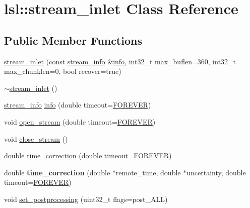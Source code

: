 \hypertarget{classlsl_1_1stream__inlet}{}\section{lsl\+:\+:stream\+\_\+inlet Class Reference}
\label{classlsl_1_1stream__inlet}
\subsection*{Public Member Functions}
\begin{DoxyCompactItemize}
\item 
\hyperlink{classlsl_1_1stream__inlet_a7c93b7d4fc053b2e3320841371b32919}{stream\+\_\+inlet} (const \hyperlink{classlsl_1_1stream__info}{stream\+\_\+info} \&\hyperlink{classlsl_1_1stream__inlet_ae895a8d5c10dc4072e969686fc402b5b}{info}, int32\+\_\+t max\+\_\+buflen=360, int32\+\_\+t max\+\_\+chunklen=0, bool recover=true)
\item 
\hyperlink{classlsl_1_1stream__inlet_ac3b37a1c2e376280c3144f422bb27d79}{$\sim$stream\+\_\+inlet} ()
\item 
\hyperlink{classlsl_1_1stream__info}{stream\+\_\+info} \hyperlink{classlsl_1_1stream__inlet_ae895a8d5c10dc4072e969686fc402b5b}{info} (double timeout=\hyperlink{namespacelsl_a74cfbc9077aca21295117217249721ed}{F\+O\+R\+E\+V\+ER})
\item 
void \hyperlink{classlsl_1_1stream__inlet_ad84029ed0662d755b0544c7652348718}{open\+\_\+stream} (double timeout=\hyperlink{namespacelsl_a74cfbc9077aca21295117217249721ed}{F\+O\+R\+E\+V\+ER})
\item 
void \hyperlink{classlsl_1_1stream__inlet_a77c2f10ed843723c7473aa52dcf544a0}{close\+\_\+stream} ()
\item 
double \hyperlink{classlsl_1_1stream__inlet_a845d95f5fc60fb9cd01fb73d3da75e94}{time\+\_\+correction} (double timeout=\hyperlink{namespacelsl_a74cfbc9077aca21295117217249721ed}{F\+O\+R\+E\+V\+ER})
\item 
\mbox{\label{classlsl_1_1stream__inlet_a9603f3365093f43f9e2bae1b9e9b2cd8}} 
double {\bfseries time\+\_\+correction} (double $\ast$remote\+\_\+time, double $\ast$uncertainty, double timeout=\hyperlink{namespacelsl_a74cfbc9077aca21295117217249721ed}{F\+O\+R\+E\+V\+ER})
\item 
void \hyperlink{classlsl_1_1stream__inlet_aaf40ba9c127a1828933613d0f2b0fc3d}{set\+\_\+postprocessing} (uint32\+\_\+t flags=post\+\_\+\+A\+LL)

\end{DoxyCompactItemize}
